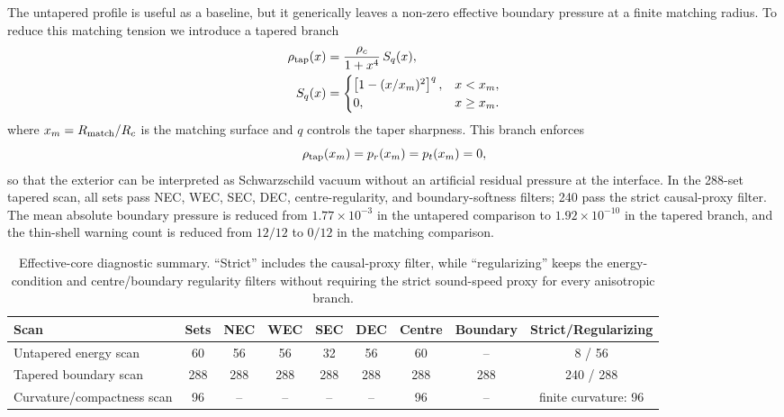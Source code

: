 \documentclass[epj]{svjour}
\begin{document}
The untapered profile is useful as a baseline, but it generically leaves a
non-zero effective boundary pressure at a finite matching radius. To reduce this
matching tension we introduce a tapered branch
\begin{equation}
\begin{aligned}
\rho_{\rm tap}(x)
&=
\frac{\rho_c}{1+x^4}\,S_q(x),
\\
S_q(x)
&=
\begin{cases}
\left[1-(x/x_m)^2\right]^q, & x<x_m,\\
0, & x\geq x_m .
\end{cases}
\end{aligned}
\label{eq:diagnostic_tapered_profile}
\end{equation}
where $x_m=R_{\rm match}/R_c$ is the matching surface and $q$ controls the
taper sharpness. This branch enforces
\begin{equation}
\rho_{\rm tap}(x_m)=p_r(x_m)=p_t(x_m)=0,
\label{eq:diagnostic_boundary_soft}
\end{equation}
so that the exterior can be interpreted as Schwarzschild vacuum without an
artificial residual pressure at the interface. In the 288-set tapered scan, all
sets pass NEC, WEC, SEC, DEC, centre-regularity, and boundary-softness filters;
240 pass the strict causal-proxy filter. The mean absolute boundary pressure is
reduced from $1.77\times10^{-3}$ in the untapered comparison to
$1.92\times10^{-10}$ in the tapered branch, and the thin-shell warning count is
reduced from $12/12$ to $0/12$ in the matching comparison.

\begin{table}
\centering
\caption{Effective-core diagnostic summary. ``Strict'' includes the causal-proxy filter, while ``regularizing'' keeps the energy-condition and centre/boundary regularity filters without requiring the strict sound-speed proxy for every anisotropic branch.}
\label{tab:effective_core_diagnostics}
\scriptsize
\begin{tabular}{lcccccccc}
\toprule
Scan & Sets & NEC & WEC & SEC & DEC & Centre & Boundary & Strict/Regularizing\\
\midrule
Untapered energy scan & 60 & 56 & 56 & 32 & 56 & 60 & -- & 8 / 56\\
Tapered boundary scan & 288 & 288 & 288 & 288 & 288 & 288 & 288 & 240 / 288\\
Curvature/compactness scan & 96 & -- & -- & -- & -- & 96 & -- & finite curvature: 96\\
\bottomrule
\end{tabular}
\end{table}
\end{document}
